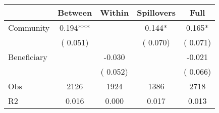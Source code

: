 
\begin{tabular}{l*{4}{c}}\hline&\multicolumn{1}{c}{Between}&\multicolumn{1}{c}{Within}&\multicolumn{1}{c}{Spillovers}&\multicolumn{1}{c}{Full}\\ \hline
 Community             &              0.194***      &                                               &        0.144* &         0.165*                            \\ 
                               &        (       0.051)           &                                       &       (       0.070)     &      (       0.071)                                           \\ 
 Beneficiary   &                                               &       -0.030    &                                &            -0.021                            \\ 
                               &                                               & (       0.052)                  &                                        &      (       0.066)                                           \\ 
\hline                                                                                                                                                                                                                                            
 Obs                   &               2126               &       1924                       &       1386                &              2718                                               \\ 
 R2                    &                      0.016              &              0.000                      &              0.017               &                     0.013                                              \\ 
\hline \end{tabular}                                                                                                                                                                                                              
